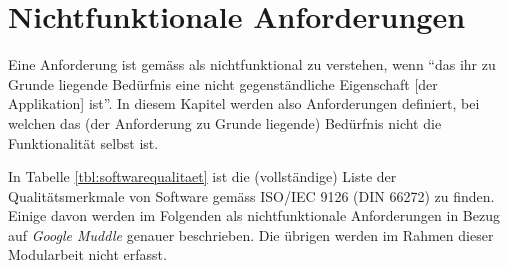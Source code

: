 \section{Nichtfunktionale Anforderungen}
\label{sec:nichtfunktionale}

Eine Anforderung ist gemäss \cite{glinz:nfr} als nichtfunktional zu verstehen, 
wenn \enquote{das ihr zu Grunde liegende Bedürfnis eine nicht gegenständliche
Eigenschaft [der Applikation] ist}. In diesem Kapitel werden also Anforderungen
definiert, bei welchen das (der Anforderung zu Grunde liegende) Bedürfnis nicht
die Funktionalität selbst ist.

In Tabelle \ref{tbl:softwarequalitaet} ist die (vollständige) Liste der
Qualitätsmerkmale von Software gemäss \acs{ISO}/\acs{IEC} 9126 (\acs{DIN} 66272)
zu finden. Einige davon werden im Folgenden als nichtfunktionale Anforderungen
in Bezug auf \textit{Google Muddle} genauer beschrieben. Die übrigen werden im
Rahmen dieser Modularbeit nicht erfasst.
\\[\intextsep]
